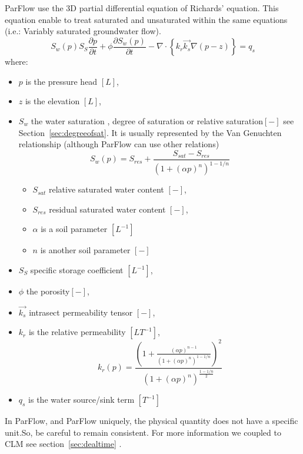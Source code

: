 \documentclass[11pt,a4paper]{report}
\begin{document}
ParFlow use the 3D partial differential equation of Richards' equation. This equation enable to treat saturated and unsaturated within the same equations (i.e.: Variably saturated groundwater flow).
\begin{equation}
S_w(p)S_S\frac{\partial p}{\partial t} + \phi\frac{\partial S_w(p)}{\partial t} - \nabla \cdot \left\{ k_r\vec{k_s}\nabla \left(p -z\right)  \right\} = q_s
\end{equation}
where:
\begin{itemize}
\item $p$ is the pressure head $[L]$,
\item $z$ is the elevation $[L]$,
\item $S_w$ the water saturation , degree of saturation or relative saturation$[-]$ see Section~\ref{sec:degreeofsat}. It is usually represented by the Van Genuchten relationship (although ParFlow can use other relations)
\begin{equation}
S_w(p)=S_{res}+\frac{S_{sat}-S_{res}}{\left(1+(\alpha p)^n
\right)^{1-1/n}}
\end{equation}
	\begin{itemize}
		\item $S_{sat}$ relative saturated water content $[-]$,
		\item $S_{res}$ residual saturated water content $[-]$,
		\item $\alpha$ is a soil parameter $[L^{-1}]$
		\item $n$ is another soil parameter $[-]$
	\end{itemize}
\item $S_S$ specific storage coefficient $[L^{-1}]$,
\item $\phi$ the porosity$[-]$, 
\item $\vec{k_s}$ intrasect permeability tensor $[-]$,
\item $k_r$ is the relative permeability $[LT^{-1}]$,
\begin{equation}
k_r(p)=\frac{\left(1+\frac{(\alpha p)^{n-1}}{\left(1+(\alpha p)^n
\right)^{1-1/n}}\right)^2}{\left(1+(\alpha p)^n
\right)^{\frac{1-1/n}{2}}}
\end{equation}
\item $q_s$ is the water source/sink term $[T^{-1}]$
\end{itemize}
In ParFlow, and ParFlow uniquely, the physical quantity does not have a specific unit.So, be careful to remain consistent. For more information we coupled to CLM see section~\ref{sec:dealtime} .
\end{document}
